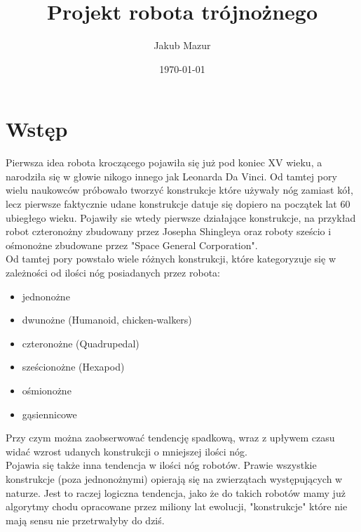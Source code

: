 \documentclass[a4paper,13pt]{article}
\title{Projekt robota trójnożnego}
\author{Jakub Mazur}
\date{\today}
\begin{document}


\maketitle

\hypersetup{
	linktocpage=true,
    colorlinks=true,
    urlcolor=red,
    linktoc=all,
    linkcolor=blue,
}
\tableofcontents

\section{Wstęp}
Pierwsza idea robota kroczącego pojawiła się już pod koniec XV wieku, a narodziła się w głowie nikogo innego jak Leonarda Da Vinci. Od tamtej pory wielu naukowców próbowało tworzyć konstrukcje które używały nóg zamiast kół, lecz pierwsze faktycznie udane konstrukcje datuje się dopiero na początek lat 60 ubiegłego wieku. Pojawiły sie wtedy pierwsze działające konstrukcje, na przykład robot czteronożny zbudowany przez Josepha Shingleya oraz roboty sześcio i ośmonożne zbudowane przez "Space General Corporation".\\

Od tamtej pory powstało wiele różnych konstrukcji, które kategoryzuje się w zależności od ilości nóg posiadanych przez robota:\\
\begin{itemize}
	\item jednonożne
	\item dwunożne (Humanoid, chicken-walkers)
	\item czteronożne (Quadrupedal)
	\item sześcionożne (Hexapod)
	\item ośmionożne
	\item gąsiennicowe
\end{itemize}

Przy czym można zaobserwować tendencję spadkową, wraz z upływem czasu widać wzrost udanych konstrukcji o mniejszej ilości nóg.\\

Pojawia się także inna tendencja w ilości nóg robotów. Prawie wszystkie konstrukcje (poza jednonożnymi) opierają się na zwierzątach występujących w naturze.  Jest to raczej logiczna tendencja, jako że do takich robotów mamy już algorytmy chodu opracowane przez miliony lat ewolucji, "konstrukcje" które nie mają sensu nie przetrwałyby do dziś.
\end{document}
